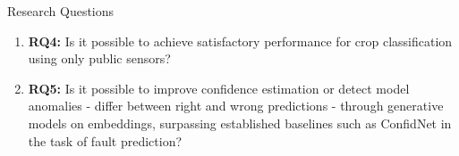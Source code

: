 \begin{frame}{Research Questions}
    \begin{enumerate}
        \item \textbf{RQ4:} Is it possible to achieve satisfactory performance for crop classification using only public sensors?
        \item \textbf{RQ5:} Is it possible to improve confidence estimation or detect model anomalies - differ between right and wrong predictions - through generative models on embeddings, surpassing established baselines such as ConfidNet in the task of fault prediction?
    \end{enumerate}
\end{frame}